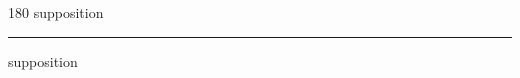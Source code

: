 
\begin{frame}
\begin{center}
\begin{turn}{180}
{\fontsize{2.5cm}{1em}\selectfont supposition}
\end{turn}
\vspace{1em}\par  
\hrule
\vspace{1em}\par  
{\fontsize{2.5cm}{1em}\selectfont supposition}
\end{center}
\end{frame}

